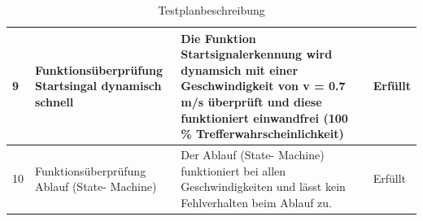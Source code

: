 \documentclass[../../main.tex]{subfiles}
\begin{document}
\begin{landscape}
\begin{table}[H]
\begin{flushleft}
\begin{tabular}{|l|p{6cm}|p{11cm}|l|}
          9 & Funktionsüberprüfung Startsingal dynamisch schnell & Die Funktion Startsignalerkennung wird dynamsich mit einer Geschwindigkeit von v = 0.7 m/s überprüft und diese funktioniert einwandfrei (100 \% Trefferwahrscheinlichkeit) & Erfüllt \\\hline
          10 & Funktionsüberprüfung Ablauf (State- Machine) & Der Ablauf (State- Machine) funktioniert bei allen Geschwindigkeiten und lässt kein Fehlverhalten beim Ablauf zu. & Erfüllt \\\hline
      \end{tabular}
  \end{flushleft}
  \caption{Testplanbeschreibung}
  \label{tab:testplan}
\end{table}

\end{landscape}
\newpage
\end{document}
